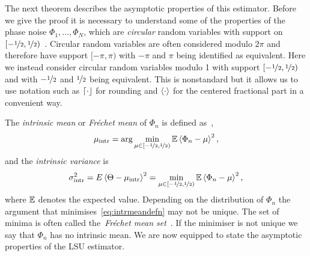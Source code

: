 \documentclass[journal]{IEEEtran}
\begin{document}
The next theorem describes the asymptotic properties of this estimator.  Before we give the proof it is necessary to understand some of the properties of the phase noise $\Phi_1,\dots,\Phi_N$, which are \emph{circular} random variables with support on $[-\nicefrac{1}{2}, \nicefrac{1}{2})$~\cite{McKilliam2010thesis,McKilliam_mean_dir_est_sq_arc_length2010,Mardia_directional_statistics,Fisher1993}.  Circular random variables are often considered modulo $2\pi$ and therefore have support $[-\pi, \pi)$ with $-\pi$ and $\pi$ being identified as equivalent.  Here we instead consider circular random variables modulo 1 with support $[-\nicefrac{1}{2}, \nicefrac{1}{2})$ and with $-\nicefrac{1}{2}$ and $\nicefrac{1}{2}$ being equivalent.  This is nonstandard but it allows us to use notation such as ${\left\lceil \cdot \right\rfloor}$ for rounding and $\left\langle \cdot \right\rangle$ for the centered fractional part in a convenient way.   %

The \emph{intrinsic mean} or \emph{Fr\'{e}chet mean} of $\Phi_n$ is defined as~\cite{McKilliam_mean_dir_est_sq_arc_length2010,bwhk07a,Bhattacharya_int_ext_means_2003,Bhattacharya_int_ext_means_2005},
\begin{equation}\label{eq:intrmeandefn}
 \mu_{\text{intr}}  = \arg \min_{\mu \in [-\nicefrac{1}{2}, \nicefrac{1}{2})} \expect \fracpart{\Phi_n - \mu}^2, 
\end{equation}
and the \emph{intrinsic variance} is
\[
\sigma_{\text{intr}}^2 = E\left\langle \Theta - \mu_{\text{intr}} \right\rangle^2 = \min_{\mu \in [-\nicefrac{1}{2}, \nicefrac{1}{2})} {\mathbb E} \left\langle \Phi_n - \mu \right\rangle^2,
\]
where ${\mathbb E}$ denotes the expected value.  Depending on the distribution of $\Phi_n$ the argument that minimises~\eqref{eq:intrmeandefn} may not be unique.  The set of minima is often called the~\emph{Fr\'{e}chet mean set}~\cite{Bhattacharya_int_ext_means_2003,Bhattacharya_int_ext_means_2005}.  If the minimiser is not unique we say that $\Phi_n$ has no intrinsic mean.  We are now equipped to state the asymptotic properties of the LSU estimator.
\end{document}

